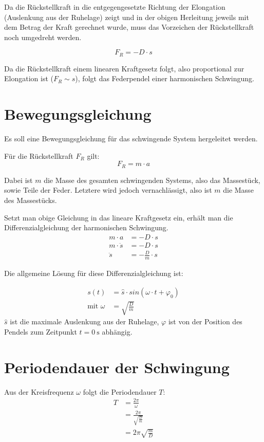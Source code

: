 Da die Rückstellkraft in die entgegengesetzte Richtung der Elongation (Auslenkung aus der Ruhelage) zeigt und in der obigen Herleitung jeweils mit dem Betrag der Kraft gerechnet wurde, muss das Vorzeichen der Rückstellkraft noch umgedreht werden.

$$F_R = -D \cdot s$$

Da die Rückstellkraft einem linearen Kraftgesetz folgt, also proportional zur Elongation ist ($F_R \sim s$), folgt das Federpendel einer harmonischen Schwingung.

\section{Bewegungsgleichung}
Es soll eine Bewegungsgleichung für das schwingende System hergeleitet werden.

Für die Rückstellkraft $F_R$ gilt:
$$F_R = m \cdot a$$

Dabei ist $m$ die Masse des gesamten schwingenden Systems, also das Massestück, sowie Teile der Feder. Letztere wird jedoch vernachlässigt, also ist $m$ die Masse des Massestücks.

Setzt man obige Gleichung in das lineare Kraftgesetz ein, erhält man die Differenzialgleichung der harmonischen Schwingung.
\begin{align*}
m \cdot a &= -D \cdot s \\
m \cdot \ddot s &= -D \cdot s \\
\ddot s &= -\frac{D}{m} \cdot s
\end{align*}

Die allgemeine Lösung für diese Differenzialgleichung ist:

\begin{align*}
s(t) &= \hat s \cdot sin(\omega \cdot t + \varphi_0) \\
\text{mit } \omega &= \sqrt{\frac{D}{m}}
\end{align*}
$\hat s$ ist die maximale Auslenkung aus der Ruhelage, $\varphi$ ist von der Position des Pendels zum Zeitpunkt $t = \SI{0}{\second}$ abhängig.

\section{Periodendauer der Schwingung}
Aus der Kreisfrequenz $\omega$ folgt die Periodendauer $T$:
\begin{align*}
T &= \frac{2\pi}{\omega} \\
  &= \frac{2\pi}{\sqrt{\frac{D}{m}}} \\
  &= 2\pi\sqrt{\frac{m}{D}}
\end{align*}